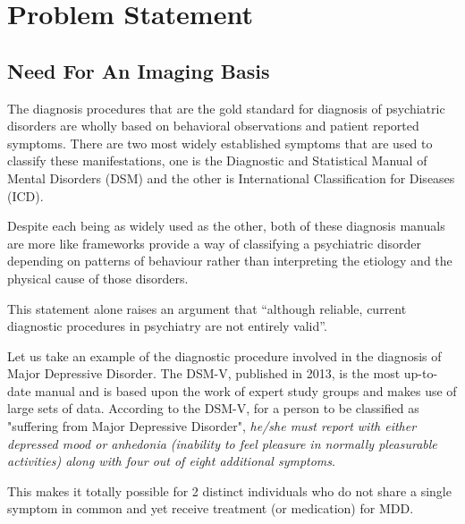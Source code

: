 \documentclass{article}
\begin{document}
\newpage

\section{Problem Statement}

\subsection{Need For An Imaging Basis}

The diagnosis procedures that are the gold standard for diagnosis of
psychiatric disorders are wholly based on behavioral observations and
patient reported symptoms. There are two most widely established
symptoms that are used to classify these manifestations, one is the
Diagnostic and Statistical Manual of Mental Disorders (DSM) and the
other is International Classification for Diseases (ICD).

Despite each being as widely used as the other, both of these
diagnosis manuals are more like frameworks provide a way of
classifying a psychiatric disorder depending on patterns of behaviour
rather than interpreting the etiology and the physical cause of those
disorders.

This statement alone raises an argument that ``although reliable,
current diagnostic procedures in psychiatry are not entirely valid''.

\iffalse
Reliable in the sense that any trained professional will arrive at
the same diagnosis for each patient.

Valid in the sense that it reflects the underlying psychological
and biological commonalities and differences among different
disorders to a certain extent. Validity continues to be more
difficult to achieve.
\fi

Let us take an example of the diagnostic procedure involved in the
diagnosis of Major Depressive Disorder. The DSM-V, published in 2013,
is the most up-to-date manual and is based upon the work of expert
study groups and makes use of large sets of data. According to the
DSM-V, for a person to be classified as "suffering from Major
Depressive Disorder", \textit{he/she must report with either depressed
mood or anhedonia (inability to feel pleasure in normally pleasurable
activities) along with four out of eight additional symptoms}.

This makes it totally possible for 2 distinct individuals who do not
share a single symptom in common and yet receive treatment (or
medication) for MDD.
\end{document}
